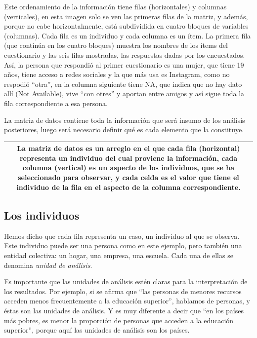 \documentclass[]{book}
\begin{document}
Este ordenamiento de la información tiene filas (horizontales) y columnas (verticales), en esta imagen solo se ven las primeras filas de la matriz, y además, porque no cabe horizontalmente, está subdividida en cuatro bloques de variables (columnas). Cada fila es un individuo y cada columna es un ítem. La primera fila (que continúa en los cuatro bloques) muestra los nombres de los ítems del cuestionario y las seis filas mostradas, las respuestas dadas por los encuestados. Así, la persona que respondió al primer cuestionario es una mujer, que tiene 19 años, tiene acceso a redes sociales y la que más usa es Instagram, como no respodió ``otra'', en la columna siguiente tiene NA, que indica que no hay dato allí (Not Available), vive ``con otres'' y aportan entre amigos y así sigue toda la fila correspondiente a esa persona.

La matriz de datos contiene toda la información que será insumo de los análisis posteriores, luego será necesario definir qué es cada elemento que la constituye.

\begin{longtable}[]{@{}c@{}}
\toprule
\endhead
\begin{minipage}[t]{0.97\columnwidth}\centering
La matriz de datos es un arreglo en el que cada fila (horizontal) representa un individuo del cual proviene la información, cada columna (vertical) es un aspecto de los individuos, que se ha seleccionado para observar, y cada celda es el valor que tiene el individuo de la fila en el aspecto de la columna correspondiente.\strut
\end{minipage}\tabularnewline
\bottomrule
\end{longtable}

\hypertarget{los-individuos}{%
\subsection{Los individuos}\label{los-individuos}}

Hemos dicho que cada fila representa un caso, un individuo al que se observa. Este individuo puede ser una persona como en este ejemplo, pero también una entidad colectiva: un hogar, una empresa, una escuela. Cada una de ellas se denomina \emph{unidad de análisis}.

Es importante que las unidades de análisis estén claras para la interpretación de los resultados. Por ejemplo, si se afirma que ``las personas de menores recursos acceden menos frecuentemente a la educación superior'', hablamos de personas, y éstas son las unidades de análisis. Y es muy diferente a decir que ``en los países más pobres, es menor la proporción de personas que acceden a la educación superior'', porque aquí las unidades de análisis son los países.
\end{document}
